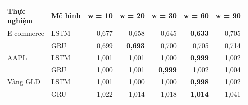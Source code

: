 \begin{tabular}{llrrrrr}
\toprule
\makecell[l]{Thực\\nghiệm} & Mô hình & w = 10 & w = 20 & w = 30 & w = 60 & w = 90 \\
\midrule
E-commerce & LSTM & 0{,}677 & 0{,}658 & 0{,}645 & \textbf{0{,}633} & 0{,}705 \\
 & GRU & 0{,}699 & \textbf{0{,}693} & 0{,}700 & 0{,}705 & 0{,}714 \\
AAPL & LSTM & 1{,}001 & 1{,}001 & 1{,}000 & \textbf{0{,}999} & 1{,}002 \\
 & GRU & 1{,}000 & 1{,}001 & \textbf{0{,}999} & 1{,}002 & 1{,}004 \\
Vàng GLD & LSTM & 1{,}001 & 1{,}000 & 1{,}000 & \textbf{0{,}998} & 1{,}002 \\
 & GRU & 1{,}022 & 1{,}014 & 1{,}018 & \textbf{1{,}014} & 1{,}041 \\
\bottomrule
\end{tabular}
